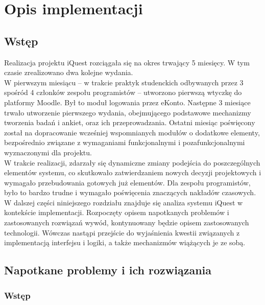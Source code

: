 \chapter{Opis implementacji}
\label{Chapter6}

\section{Wstęp}
\label{Chapter61}

Realizacja projektu iQuest rozciągała się na okres trwający 5 miesięcy. W tym czasie zrealizowano dwa kolejne wydania. \\

W pierwszym miesiącu -- w trakcie praktyk studenckich odbywanych przez 3 spośród 4 członków zespołu programistów -- utworzono pierwszą wtyczkę do platformy Moodle. Był to moduł logowania przez eKonto. Następne 3 miesiące trwało utworzenie pierwszego wydania, obejmującego podstawowe mechanizmy tworzenia badań i ankiet, oraz ich przeprowadzania. Ostatni miesiąc poświęcony został na dopracowanie wcześniej wspomnianych modułów o dodatkowe elementy, bezpośrednio związane z wymaganiami funkcjonalnymi i pozafunkcjonalnymi wyznaczonymi dla projektu. \\

W trakcie realizacji, zdarzały się dynamiczne zmiany podejścia do poszczególnych elementów systemu, co skutkowało zatwierdzaniem nowych decyzji projektowych i wymagało przebudowania gotowych już elementów. Dla zespołu programistów, było to bardzo trudne i wymagało poświęcenia znaczących nakładów czasowych. \\

W dalszej części niniejszego rozdziału znajduje się analiza systemu iQuest w kontekście implementacji. Rozpoczęty opisem napotkanych problemów i zastosowanych rozwiązań wywód, kontynuowany będzie opisem zastosowanych technologii. Wówczas nastąpi przejście do wyjaśnienia kwestii związanych z implementacją interfejsu i logiki, a także mechanizmów wiążących je ze sobą.

\section{Napotkane problemy i ich rozwiązania}
\label{Chapter62}

\subsection{Wstęp}
\label{Chapter621}

